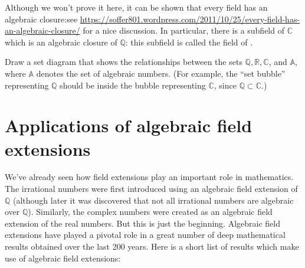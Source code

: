 Although we won't prove it here, it can be shown that every field has an algebraic closure:see  \url{https://soffer801.wordpress.com/2011/10/25/every-field-has-an-algebraic-closure/} for a nice discussion. In particular, there is a subfield of $\mathbb{C}$ which is an algebraic closure of $\mathbb{Q}$: this subfield is called the field of .

\begin{exercise}{}
Draw a set diagram that shows the relationships between the sets $\mathbb{Q}, \mathbb{R}, \mathbb{C}$, and $\mathbb{A}$, where $\mathbb{A}$ denotes the set of algebraic numbers.  (For example, the ``set bubble'' representing $\mathbb{Q}$ should be inside the bubble representing $\mathbb{C}$, since $\mathbb{Q} \subset \mathbb{C}$.)
\end{exercise}

\section{Applications of algebraic field extensions}

We've already seen how field extensions play an important role in mathematics.  The irrational numbers were first introduced using an algebraic  field extension  of $\mathbb{Q}$  (although later it was discovered that not all irrational numbers are algebraic over $\mathbb{Q}$).  Similarly, the complex numbers were created as an algebraic field extension of the real numbers.  But this is just the beginning. Algebraic field extensions have played a pivotal role in a great number of deep mathematical results obtained over the last 200 years. Here is a short list of results which make use of algebraic field extensions:

